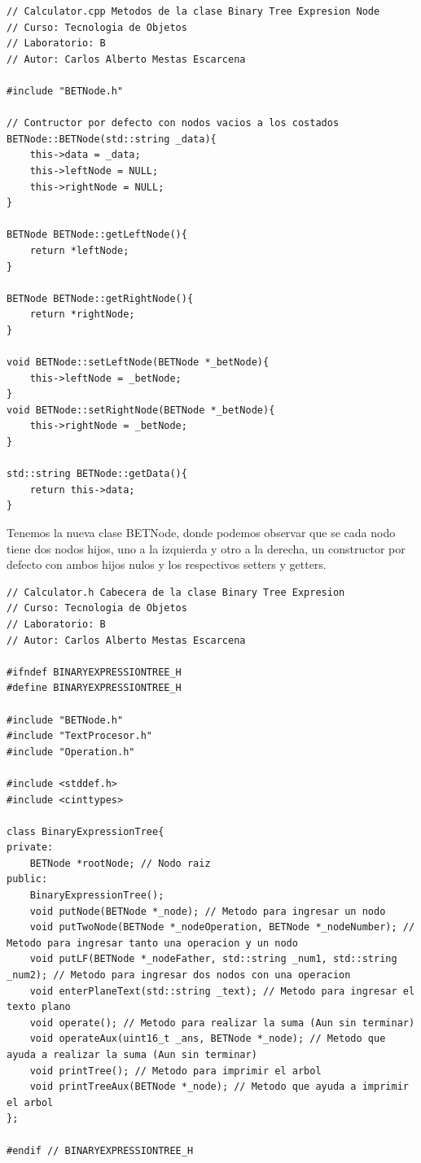 \documentclass[a4paper,12pt]{article}
\begin{document}
\begin{verbatim} 
// Calculator.cpp Metodos de la clase Binary Tree Expresion Node
// Curso: Tecnologia de Objetos
// Laboratorio: B
// Autor: Carlos Alberto Mestas Escarcena

#include "BETNode.h"

// Contructor por defecto con nodos vacios a los costados
BETNode::BETNode(std::string _data){
    this->data = _data;
    this->leftNode = NULL;
    this->rightNode = NULL;
}

BETNode BETNode::getLeftNode(){
    return *leftNode;
}

BETNode BETNode::getRightNode(){
    return *rightNode;
}

void BETNode::setLeftNode(BETNode *_betNode){
    this->leftNode = _betNode;
}
void BETNode::setRightNode(BETNode *_betNode){
    this->rightNode = _betNode;
}

std::string BETNode::getData(){
    return this->data;
}
\end{verbatim} 

Tenemos la nueva clase BETNode, donde podemos observar que se cada nodo tiene dos nodos hijos, uno a la izquierda y otro a la derecha, un constructor por defecto con ambos hijos nulos y los respectivos setters y getters.

\begin{verbatim} 
// Calculator.h Cabecera de la clase Binary Tree Expresion
// Curso: Tecnologia de Objetos
// Laboratorio: B
// Autor: Carlos Alberto Mestas Escarcena

#ifndef BINARYEXPRESSIONTREE_H
#define BINARYEXPRESSIONTREE_H

#include "BETNode.h"
#include "TextProcesor.h"
#include "Operation.h"

#include <stddef.h>
#include <cinttypes>

class BinaryExpressionTree{
private:
    BETNode *rootNode; // Nodo raiz
public:
    BinaryExpressionTree();
    void putNode(BETNode *_node); // Metodo para ingresar un nodo
    void putTwoNode(BETNode *_nodeOperation, BETNode *_nodeNumber); // Metodo para ingresar tanto una operacion y un nodo
    void putLF(BETNode *_nodeFather, std::string _num1, std::string _num2); // Metodo para ingresar dos nodos con una operacion
    void enterPlaneText(std::string _text); // Metodo para ingresar el texto plano
    void operate(); // Metodo para realizar la suma (Aun sin terminar)
    void operateAux(uint16_t _ans, BETNode *_node); // Metodo que ayuda a realizar la suma (Aun sin terminar)
    void printTree(); // Metodo para imprimir el arbol
    void printTreeAux(BETNode *_node); // Metodo que ayuda a imprimir el arbol
};

#endif // BINARYEXPRESSIONTREE_H
\end{verbatim} 
\end{document}
